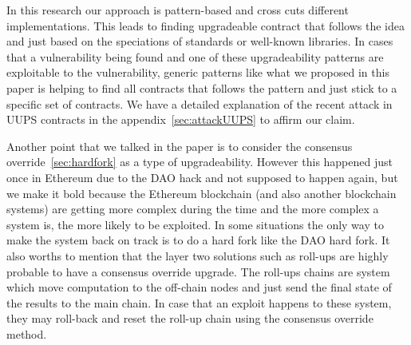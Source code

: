 In this research our approach is pattern-based and cross cuts different implementations. This leads to finding upgradeable contract that follows the idea and just based on the speciations of standards or well-known libraries. In cases that a vulnerability being found and one of these upgradeability patterns are exploitable to the vulnerability, generic patterns like what we proposed in this paper is helping to find all contracts that follows the pattern and just stick to a specific set of contracts. We have a detailed explanation of the recent attack in UUPS contracts in the appendix~\ref{sec:attackUUPS} to affirm our claim. 

Another point that we talked in the paper is to consider the consensus override~\ref{sec:hardfork} as a type of upgradeability. However this happened just once in Ethereum due to the DAO hack and not supposed to happen again, but we make it bold because the Ethereum blockchain (and also another blockchain systems) are getting more complex during the time and the more complex a system is, the more likely to be exploited. In some situations the only way to make the system back on track is to do a hard fork like the DAO hard fork. 
It also worths to mention that the layer two solutions such as roll-ups are highly probable to have a consensus override upgrade. The roll-ups chains are system which move computation to the off-chain nodes and just send the final state of the results to the main chain. In case that an exploit happens to these system, they may roll-back and reset the roll-up chain using the consensus override method.   


